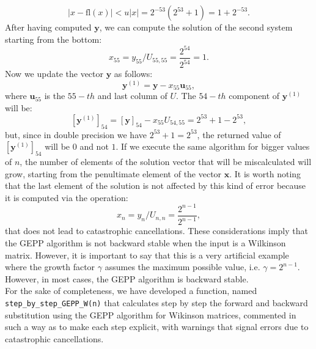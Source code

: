 \documentclass[a4paper,11pt]{article}
\begin{document}
\begin{equation}
	|x - \text{fl}(x)| < u |x| = 2^{-53}(2^{53}+1) = 1 + 2^{-53}.
\end{equation}
After having computed $\textbf{y}$, we can compute the solution of the second system starting from the bottom:
\begin{equation}\label{key}
	x_{55} = y_{55}/U_{55,55} = \frac{2^{54}}{2^{54}} = 1.
\end{equation}
Now we update the vector $\textbf{y}$ as follows:
\begin{equation}\label{key}
	\textbf{y}^{(1)} = \textbf{y} - x_{55} \textbf{u}_{55},
\end{equation}
where $\textbf{u}_{55}$ is the $55-th$ and last column of $U$. The $54-th$ component of $\textbf{y}^{(1)}$ will be:
\begin{equation}\label{key}
	[\textbf{y}^{(1)}]_{54} = [\textbf{y}]_{54} - x_{55} U_{54,55} = 2^{53} + 1 - 2^{53},
\end{equation}
but, since in double precision we have $ 2^{53} + 1 = 2^{53}$, the returned value of  $[\textbf{y}^{(1)}]_{54}$ will be $0$ and not $1$. If we execute the same algorithm for bigger values of $n$, the number of elements of the solution vector that will be miscalculated will grow, starting from the penultimate element of the vector $\textbf{x}$. It is worth noting that the last element of the solution is not affected by this kind of error because it is computed via the operation:
\begin{equation}\label{key}
	x_{n} = y_{n}/U_{n,n} = \frac{2^{n-1}}{2^{n-1}},
\end{equation}
that does not lead to catastrophic cancellations. These considerations imply that the GEPP algorithm is not backward stable when the input is a Wilkinson matrix. However, it is important to say that this is a very artificial example where the growth factor $\gamma$ assumes the maximum possible value, i.e. $\gamma = 2^{n-1}$. However, in most cases, the GEPP algorithm is backward stable.\\

\noindent For the sake of completeness, we have developed a function, named \texttt{step_by_step_GEPP_W(n)} that calculates step by step the forward and backward substitution using the GEPP algorithm for Wikinson matrices, commented in such a way as to make each step explicit, with warnings that signal errors due to catastrophic cancellations.
\end{document}
